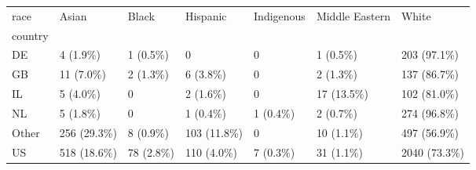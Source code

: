 \begin{tabular}{lllllll}
\toprule
race &        Asian &      Black &     Hispanic & Indigenous & Middle Eastern &         White \\
country &              &            &              &            &                &               \\
\midrule
DE      &     4 (1.9\%) &   1 (0.5\%) &            0 &          0 &       1 (0.5\%) &   203 (97.1\%) \\
GB      &    11 (7.0\%) &   2 (1.3\%) &     6 (3.8\%) &          0 &       2 (1.3\%) &   137 (86.7\%) \\
IL      &     5 (4.0\%) &          0 &     2 (1.6\%) &          0 &     17 (13.5\%) &   102 (81.0\%) \\
NL      &     5 (1.8\%) &          0 &     1 (0.4\%) &   1 (0.4\%) &       2 (0.7\%) &   274 (96.8\%) \\
Other   &  256 (29.3\%) &   8 (0.9\%) &  103 (11.8\%) &          0 &      10 (1.1\%) &   497 (56.9\%) \\
US      &  518 (18.6\%) &  78 (2.8\%) &   110 (4.0\%) &   7 (0.3\%) &      31 (1.1\%) &  2040 (73.3\%) \\
\bottomrule
\end{tabular}
